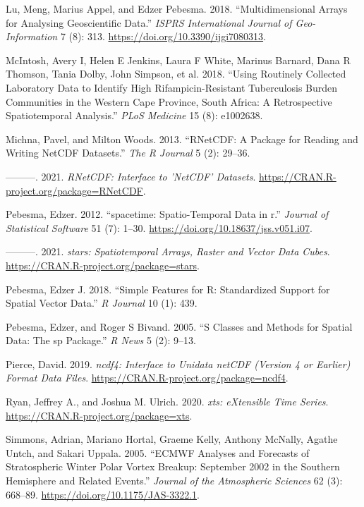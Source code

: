 \documentclass{article}
\newlength{\cslhangindent}
\newlength{\cslentryspacingunit} %
\newenvironment{CSLReferences}[2] %
 {%
  \setlength{\parindent}{0pt}
  \ifodd #1
  \let\oldpar\par
  \def\par{\hangindent=\cslhangindent\oldpar}
  \fi
  \setlength{\parskip}{#2\cslentryspacingunit}
 }%
 {}
\begin{document}
\begin{CSLReferences}{1}{0}
\leavevmode\hypertarget{ref-lu_multidimensional_2018}{}%
Lu, Meng, Marius Appel, and Edzer Pebesma. 2018. {``Multidimensional {Arrays} for {Analysing} {Geoscientific} {Data}.''} \emph{ISPRS International Journal of Geo-Information} 7 (8): 313. \url{https://doi.org/10.3390/ijgi7080313}.

\leavevmode\hypertarget{ref-mcintosh2018using}{}%
McIntosh, Avery I, Helen E Jenkins, Laura F White, Marinus Barnard, Dana R Thomson, Tania Dolby, John Simpson, et al. 2018. {``Using Routinely Collected Laboratory Data to Identify High Rifampicin-Resistant Tuberculosis Burden Communities in the Western Cape Province, South Africa: A Retrospective Spatiotemporal Analysis.''} \emph{PLoS Medicine} 15 (8): e1002638.

\leavevmode\hypertarget{ref-michna2013rnetcdf}{}%
Michna, Pavel, and Milton Woods. 2013. {``{RNetCDF}: A Package for Reading and Writing NetCDF Datasets.''} \emph{The R Journal} 5 (2): 29--36.

\leavevmode\hypertarget{ref-rnetcdf}{}%
---------. 2021. \emph{{RNetCDF}: Interface to 'NetCDF' Datasets}. \url{https://CRAN.R-project.org/package=RNetCDF}.

\leavevmode\hypertarget{ref-spacetime}{}%
Pebesma, Edzer. 2012. {``{spacetime}: Spatio-Temporal Data in r.''} \emph{Journal of Statistical Software} 51 (7): 1--30. \url{https://doi.org/10.18637/jss.v051.i07}.

\leavevmode\hypertarget{ref-stars}{}%
---------. 2021. \emph{{stars}: Spatiotemporal Arrays, Raster and Vector Data Cubes}. \url{https://CRAN.R-project.org/package=stars}.

\leavevmode\hypertarget{ref-sf}{}%
Pebesma, Edzer J. 2018. {``Simple Features for {R}: Standardized Support for Spatial Vector Data.''} \emph{R Journal} 10 (1): 439.

\leavevmode\hypertarget{ref-sp}{}%
Pebesma, Edzer, and Roger S Bivand. 2005. {``S Classes and Methods for Spatial Data: The {sp} Package.''} \emph{R News} 5 (2): 9--13.

\leavevmode\hypertarget{ref-ncdf4}{}%
Pierce, David. 2019. \emph{{ncdf4}: Interface to Unidata netCDF (Version 4 or Earlier) Format Data Files}. \url{https://CRAN.R-project.org/package=ncdf4}.

\leavevmode\hypertarget{ref-xts}{}%
Ryan, Jeffrey A., and Joshua M. Ulrich. 2020. \emph{{xts}: eXtensible Time Series}. \url{https://CRAN.R-project.org/package=xts}.

\leavevmode\hypertarget{ref-simmons2005ecmwf}{}%
Simmons, Adrian, Mariano Hortal, Graeme Kelly, Anthony McNally, Agathe Untch, and Sakari Uppala. 2005. {``ECMWF Analyses and Forecasts of Stratospheric Winter Polar Vortex Breakup: September 2002 in the Southern Hemisphere and Related Events.''} \emph{Journal of the Atmospheric Sciences} 62 (3): 668--89. \url{https://doi.org/10.1175/JAS-3322.1}.


\end{CSLReferences}
\end{document}
